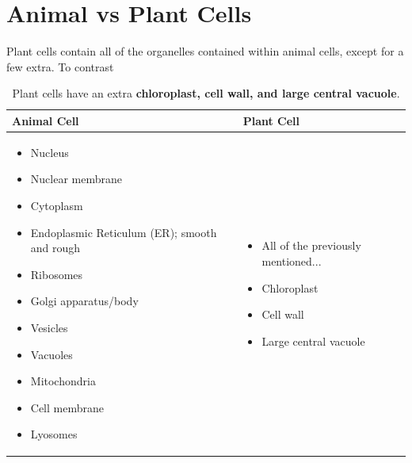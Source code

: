 \documentclass[12pt]{report}
\begin{document}
\section{Animal vs Plant Cells}
Plant cells contain all of the organelles contained within animal cells, except for a few extra. To contrast 
\begin{table}[h!]
    \renewcommand{\arraystretch}{1.5}
    \setlength{\tabcolsep}{10pt}
    \setlength{\arrayrulewidth}{0.25mm}

    \begin{center}
        \vspace{0.5em}
        \begin{tabular}{|p{ }|p{ }|}
        \hline
        \textbf{Animal Cell} & \textbf{Plant Cell} \\ 
        \hline
        \begin{itemize}
            \item{Nucleus}
            \item{Nuclear membrane}
            \item{Cytoplasm}
            \item{Endoplasmic Reticulum (ER); smooth and rough}
            \item{Ribosomes}
            \item{Golgi apparatus/body}
            \item{Vesicles}
            \item{Vacuoles}
            \item{Mitochondria}
            \item{Cell membrane}
            \item{Lyosomes}
        \end{itemize}
                             & 
            \begin{itemize}
                \item{All of the previously mentioned...}
                \item{Chloroplast}
                \item{Cell wall}
                \item{Large central vacuole}
            \end{itemize}
                             \\
        \hline
        \end{tabular}
    \end{center}
    \caption{Plant cells have an extra \textbf{chloroplast, cell wall, and large central vacuole}.}
\end{table}
\end{document}
